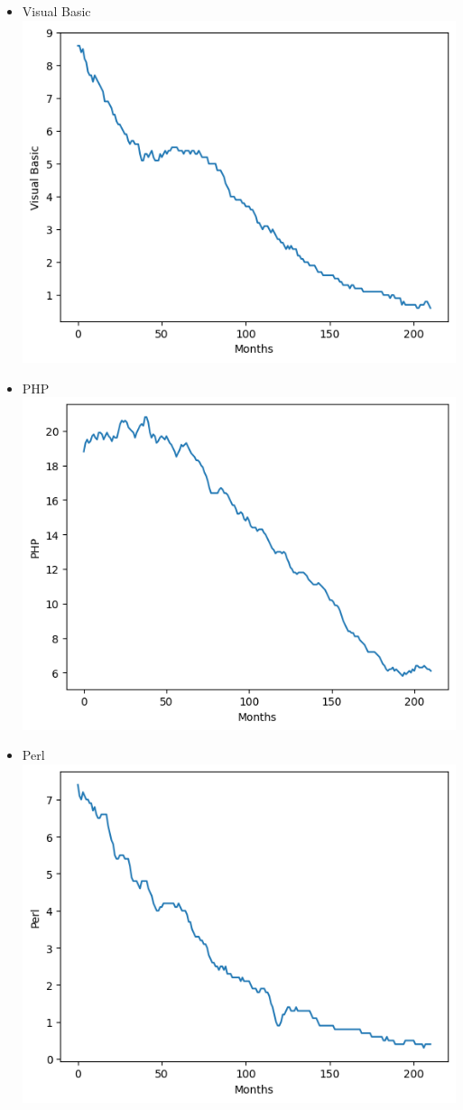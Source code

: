 \documentclass[conference]{IEEEtran}
\begin{document}
\begin{itemize}
\item{Visual Basic}
\includegraphics[scale=0.4]{lineplot/visualbasic.png}
\item{PHP}
\includegraphics[scale=0.4]{lineplot/php.png}
\item{Perl}
\includegraphics[scale=0.4]{lineplot/perl.png}

\end{itemize}
\end{document}
